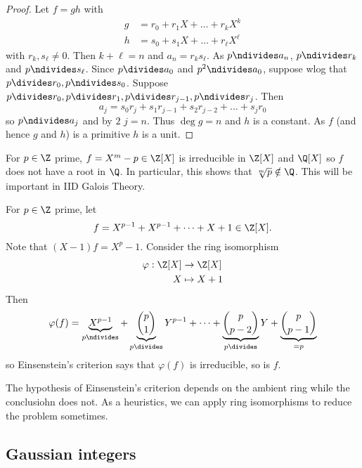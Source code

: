 \documentclass[a4paper]{article}
\theoremstyle{definition}
\begin{document}
\begin{proof}
  Let \(f = gh\) with
  \begin{align*}
    g &= r_0 + r_1X + \dots + r_kX^k \\
    h &= s_0 + s_1X + \dots + r_\ell X^\ell
  \end{align*}
  with \(r_k, s_\ell \neq 0\). Then \(k + \ell = n\) and \(a_n = r_ks_\ell\). As \(p \ndivides a_n\), \(p \ndivides r_k\) and \(p \ndivides s_\ell\). Since \(p \divides a_0\) and \(p^2 \ndivides a_0\), suppose wlog that \(p \divides r_0, p \ndivides s_0\). Suppose \(p \divides r_0, p \divides r_1, p \divides r_{j - 1}, p \ndivides r_j\). Then
  \[
    a_j = s_0r_j + s_1r_{j - 1} + s_2r_{j - 2} + \dots + s_j r_0
  \]
  so \(p \ndivides a_j\) and by \(2\) \(j = n\). Thus \(\deg g = n\) and \(h\) is a constant. As \(f\) (and hence \(g\) and \(h\)) is a primitive \(h\) is a unit.
\end{proof}

\begin{eg}
  For \(p \in \Z\) prime, \(f = X^m - p \in \Z[X]\) is irreducible in \(\Z[X]\) and \(\Q[X]\) so \(f\) does not have a root in \(\Q\). In particular, this shows that \(\sqrt[m]{p} \notin \Q\). This will be important in IID Galois Theory.
\end{eg}

\begin{eg}
  For \(p \in \Z\) prime, let
  \[
    f = X^{p - 1} + X^{p - 1} + \dots + X + 1 \in \Z[X].
  \]
  Note that \((X - 1)f = X^p - 1\). Consider the ring isomorphism
  \begin{align*}
    \varphi: \Z[X] &\to \Z[X] \\
    X &\mapsto X + 1
  \end{align*}
  Then
  \[
    \varphi(f) = \underbrace{X^{p - 1}}_{p \ndivides} + \underbrace{\binom{p}{1}}_{p \divides} Y^{p - 1} + \dots + \underbrace{\binom{p}{p - 2}}_{p \divides} Y + \underbrace{\binom{p}{p - 1}}_{= p}
  \]
  so Einsenstein's criterion says that \(\varphi(f)\) is irreducible, so is \(f\).
\end{eg}

\begin{remark}
  The hypothesis of Einsenstein's criterion depends on the ambient ring while the conclusiohn does not. As a heuristics, we can apply ring isomorphisms to reduce the problem sometimes.
\end{remark}

\subsection{Gaussian integers}
\end{document}
